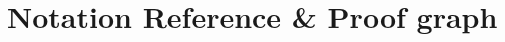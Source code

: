 \documentclass[11pt]{article}
\theoremstyle{definition}
\numberwithin{equation}{section}%
\begin{document}

\newpage
\appendix

\renewcommand{\thesection}{\Alph{section}}


\section{Notation Reference \& Proof graph}

\end{document}
